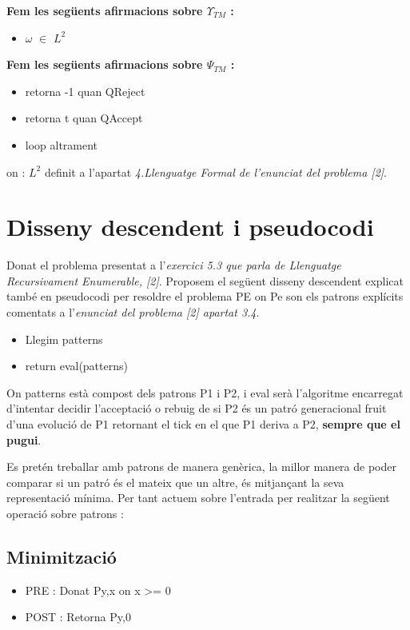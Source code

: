 \documentclass[12pt,a4paper]{report}
\def \w{$\omega$}
\def \preTM{$\Upsilon_{TM}$}
\def \postTM{$\Psi_{TM}$}
\begin{document}
\textbf{Fem les següents afirmacions sobre \preTM{} :}
 
\begin{itemize}
\item \w{} $\in$ $L^2$
\end{itemize}

\textbf{Fem les següents afirmacions sobre \postTM{} :}

\begin{itemize}
\item retorna -1 quan QReject
\item retorna t quan QAccept
\item loop altrament
\end{itemize}

on : $L^2$ definit a l'apartat \textit{4.Llenguatge Formal de l'enunciat del problema [2]}.

\section{Disseny descendent i pseudocodi}

Donat el problema presentat a l’\textit{exercici 5.3 que parla de Llenguatge Recursivament Enumerable, [2]}. Proposem el següent disseny descendent explicat també en pseudocodi per resoldre el problema PE on Pe son els patrons explícits comentats a l'\textit{enunciat del problema [2] apartat 3.4}.

\begin{itemize}
\item Llegim patterns
\item return eval(patterns)
\end{itemize}

On patterns està compost dels patrons P1 i P2, i eval serà l'algoritme encarregat d'intentar decidir l'acceptació o rebuig de si P2 és un patró generacional fruit d'una evolució de P1 retornant el tick en el que P1 deriva a P2, \textbf{sempre que el pugui}.

Es pretén treballar amb patrons de manera genèrica, la millor manera de poder comparar si un patró és el mateix que un altre, és mitjançant la seva representació mínima. Per tant actuem sobre l’entrada per realitzar la següent operació sobre patrons : 

\subsection{Minimització}

\begin{itemize}
\item PRE : Donat Py,x on x >= 0
\item POST : Retorna Py,0
\end{itemize}
\end{document}

